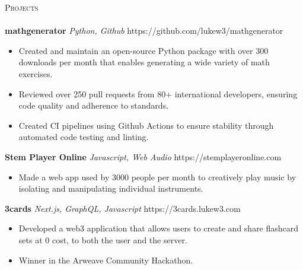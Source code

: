 \documentclass[letterpaper]{article}
\newcommand{\lineunder} {
    \vspace*{-8pt} \\
    \hspace*{-18pt} \hrulefill \\
}
\newcommand{\header} [1] {
    {\hspace*{-18pt}\vspace*{6pt} \textsc{#1}}
    \vspace*{-6pt} \lineunder
}
\begin{document}
\header{Projects}

    {\textbf{mathgenerator}} {\sl Python, Github} \hfill https://github.com/lukew3/mathgenerator\\
    \vspace{-2mm}
    \begin{itemize} \itemsep -1mm
    
        \item Created and maintain an open-source Python package with over 300 downloads per month that enables generating a wide variety of math exercises.

        \item Reviewed over 250 pull requests from 80+ international developers, ensuring code quality and adherence to standards.

        \item Created CI pipelines using Github Actions to ensure stability through automated code testing and linting.

    \end{itemize}
    \vspace{-2mm}

    {\textbf{Stem Player Online}} {\sl Javascript, Web Audio} \hfill https://stemplayeronline.com\\
    \vspace{-2mm}
    \begin{itemize} \itemsep -1mm

        \item Made a web app used by 3000 people per month to creatively play music by isolating and manipulating individual instruments.
        
    \end{itemize}
    \vspace{-2mm}

    {\textbf{3cards}} {\sl Next.js, GraphQL, Javascript} \hfill https://3cards.lukew3.com\\
    \vspace{-2mm}
    \begin{itemize} \itemsep -1mm

        \item Developed a web3 application that allows users to create and share flashcard sets at 0 cost, to both the user and the server.
        \item Winner in the Arweave Community Hackathon.
            
    \end{itemize}
    \vspace{-2mm}
\end{document}
